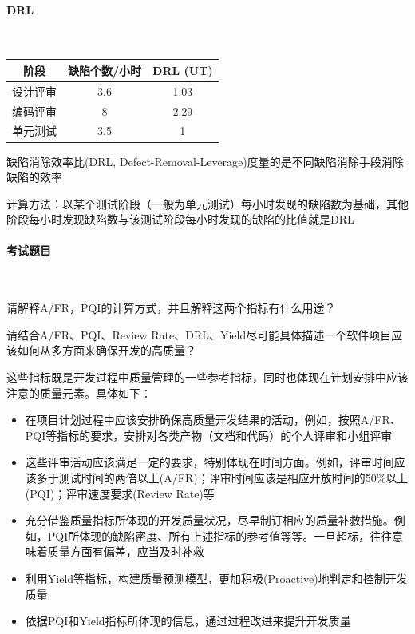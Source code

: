 \paragraph{DRL}~{} \par
\begin{table}
    \centering
    \vspace{-1.5em}
    \begin{tabular}{|c|c|c|}
        \hline
        \textbf{阶段} & \textbf{缺陷个数/小时} & \textbf{DRL (UT)} \\ \hline
        设计评审        & 3.6              & 1.03              \\ \hline
        编码评审        & 8                & 2.29              \\ \hline
        单元测试        & 3.5              & 1                 \\ \hline
        \end{tabular}
    \vspace{-1.5em}
\end{table}
缺陷消除效率比(DRL, Defect-Removal-Leverage)度量的是不同缺陷消除手段消除缺陷的效率

计算方法：以某个测试阶段（一般为单元测试）每小时发现的缺陷数为基础，其他阶段每小时发现缺陷数与该测试阶段每小时发现的缺陷的比值就是DRL

\paragraph{考试题目}~{} \par
\begin{problem}
请解释A/FR，PQI的计算方式，并且解释这两个指标有什么用途？
\end{problem}

\begin{problem}
请结合A/FR、PQI、Review Rate、DRL、Yield尽可能具体描述一个软件项目应该如何从多方面来确保开发的高质量？

这些指标既是开发过程中质量管理的一些参考指标，同时也体现在计划安排中应该注意的质量元素。具体如下：
\begin{itemize}
    \item 在项目计划过程中应该安排确保高质量开发结果的活动，例如，按照A/FR、PQI等指标的要求，安排对各类产物（文档和代码）的个人评审和小组评审
    \item 这些评审活动应该满足一定的要求，特别体现在时间方面。例如，评审时间应该多于测试时间的两倍以上(A/FR)；评审时间应该是相应开放时间的50\%以上(PQI)；评审速度要求(Review Rate)等
    \item 充分借鉴质量指标所体现的开发质量状况，尽早制订相应的质量补救措施。例如，PQI所体现的缺陷密度、所有上述指标的参考值等等。一旦超标，往往意味着质量方面有偏差，应当及时补救
    \item 利用Yield等指标，构建质量预测模型，更加积极(Proactive)地判定和控制开发质量
    \item 依据PQI和Yield指标所体现的信息，通过过程改进来提升开发质量
\end{itemize}
\end{problem}

